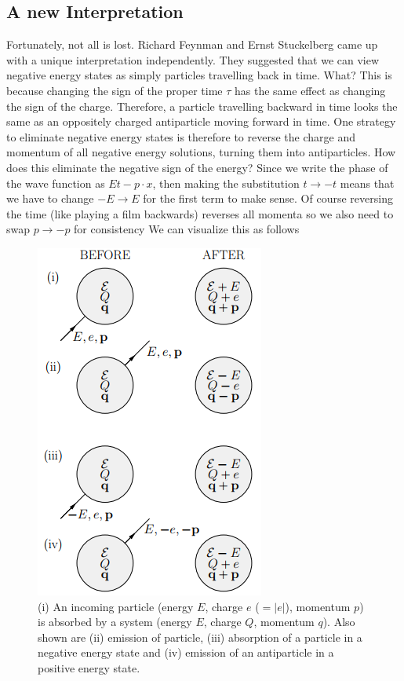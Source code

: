 \subsection{A new Interpretation}
Fortunately, not all is lost. Richard Feynman and Ernst Stuckelberg came up with a unique interpretation independently. They suggested that we can view negative energy states as simply particles travelling back in time. What? 
This is because changing the sign of the proper time $\tau$ has the same effect as
changing the sign of the charge. Therefore, a particle travelling backward in time looks the same as an oppositely charged antiparticle moving forward in time. One strategy to eliminate negative energy states
is therefore to reverse the charge and momentum of all negative energy
solutions, turning them into antiparticles. How does this eliminate the
negative sign of the energy? Since we write the phase of the wave function as $Et − p · x$, then making the substitution $t \rightarrow −t$ means that we
have to change $−E \rightarrow E$ for the first term to make sense. Of course
reversing the time (like playing a film backwards) reverses all momenta
so we also need to swap $p \rightarrow −p$ for consistency
We  can visualize this as follows
\begin{figure}
	\centering
	\includegraphics[scale=0.8]{Figures/parvis.png}
	\caption{ (i) An incoming particle (energy $E$, charge $e$ ($= |e|$), momentum
$p$) is absorbed by a system (energy $E$,
charge $Q$, momentum $q$). Also shown
are (ii) emission of particle, (iii) absorption of a particle in a negative energy
state and (iv) emission of an antiparticle in a positive energy state.}
\end{figure}

